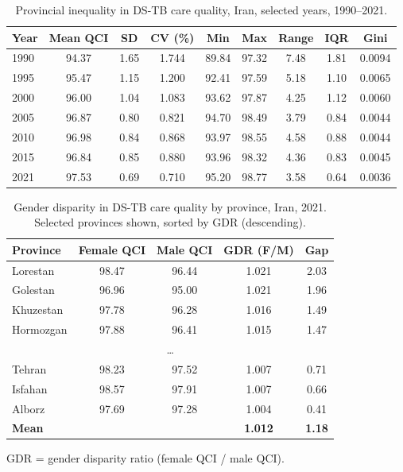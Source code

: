 \documentclass[12pt]{article}
\begin{document}
\begin{table}[htbp]
\centering
\caption{Provincial inequality in DS-TB care quality, Iran, selected years, 1990--2021.}
\label{tab:table3}
\begin{tabular}{lcccccccc}
\toprule
Year & Mean QCI & SD & CV (\%) & Min & Max & Range & IQR & Gini \\
\midrule
1990 & 94.37 & 1.65 & 1.744 & 89.84 & 97.32 & 7.48 & 1.81 & 0.0094 \\
1995 & 95.47 & 1.15 & 1.200 & 92.41 & 97.59 & 5.18 & 1.10 & 0.0065 \\
2000 & 96.00 & 1.04 & 1.083 & 93.62 & 97.87 & 4.25 & 1.12 & 0.0060 \\
2005 & 96.87 & 0.80 & 0.821 & 94.70 & 98.49 & 3.79 & 0.84 & 0.0044 \\
2010 & 96.98 & 0.84 & 0.868 & 93.97 & 98.55 & 4.58 & 0.88 & 0.0044 \\
2015 & 96.84 & 0.85 & 0.880 & 93.96 & 98.32 & 4.36 & 0.83 & 0.0045 \\
2021 & 97.53 & 0.69 & 0.710 & 95.20 & 98.77 & 3.58 & 0.64 & 0.0036 \\
\bottomrule
\end{tabular}
\end{table}

\clearpage

\begin{table}[htbp]
\centering
\caption{Gender disparity in DS-TB care quality by province, Iran, 2021. Selected provinces shown, sorted by GDR (descending).}
\label{tab:table4}
\begin{tabular}{lcccc}
\toprule
Province & Female QCI & Male QCI & GDR (F/M) & Gap \\
\midrule
Lorestan & 98.47 & 96.44 & 1.021 & 2.03 \\
Golestan & 96.96 & 95.00 & 1.021 & 1.96 \\
Khuzestan & 97.78 & 96.28 & 1.016 & 1.49 \\
Hormozgan & 97.88 & 96.41 & 1.015 & 1.47 \\
\multicolumn{5}{c}{\dots} \\
Tehran & 98.23 & 97.52 & 1.007 & 0.71 \\
Isfahan & 98.57 & 97.91 & 1.007 & 0.66 \\
Alborz & 97.69 & 97.28 & 1.004 & 0.41 \\
\midrule
\textbf{Mean} & & & \textbf{1.012} & \textbf{1.18} \\
\bottomrule
\end{tabular}

\vspace{0.5em}
\noindent\small GDR = gender disparity ratio (female QCI / male QCI).
\end{table}
\end{document}
